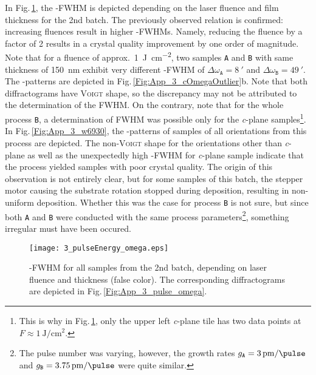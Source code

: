 In Fig.\,\ref{Fig:Results_3_pulseOmega}, the \textomega-FWHM is depicted depending on the laser fluence and film thickness for the 2nd batch.
The previously observed relation is confirmed: increasing fluences result in higher \textomega-FWHMs.
Namely, reducing the fluence by a factor of 2 results in a crystal quality improvement by one order of magnitude.
Note that for a fluence of approx.\ \qty{1}{\J\per\cm\squared}, two samples \texttt{A} and \texttt{B} with same thickness of \qty{150}{\nm} exhibit very different \textomega-FWHM of $\Delta\omega_\mathtt{A}=\qty{8}{\arcminute}$ and $\Delta\omega_\mathtt{B}=\qty{49}{\arcminute}$.
The \textomega-patterns are depicted in Fig.\,\ref{Fig:App_3_cOmegaOutlier}b.
Note that both diffractograms have \textsc{Voigt} shape, so the discrepancy may not be attributed to the determination of the \gls{FWHM}.
On the contrary, note that for the whole process \texttt{B}, a determination of FWHM was possible only for the \textit{c}-plane samples\footnote{
    This is why in Fig.\,\ref{Fig:Results_3_pulseOmega}, only the upper left \textit{c}-plane tile has two data points at $F\approx\qty{1}{\J\per\cm\squared}$.
}.
In Fig.\,\ref{Fig:App_3_w6930}, the \textomega-patterns of samples of all orientations from this process are depicted.
The non-\textsc{Voigt} shape for the orientations other than \textit{c}-plane as well as the unexpectedly high \textomega-FWHM for \textit{c}-plane sample indicate that the process yielded samples with poor crystal quality.
The origin of this observation is not entirely clear, but for some samples of this batch, the stepper motor causing the substrate rotation stopped during deposition, resulting in non-uniform deposition.
Whether this was the case for process \texttt{B} is not sure, but since both \texttt{A} and \texttt{B} were conducted with the same process parameters\footnote{
    The pulse number was varying, however, the growth rates $g_\mathtt{A}=\qty{3}{\pm\per\pulse}$ and $g_\mathtt{B}=\qty{3.75}{\pm\per\pulse}$ were quite similar.
},
something irregular must have been occured.

\begin{figure}
    \centering
    \texttt{[image: 3\_pulseEnergy\_omega.eps]}
    \caption{
        \textomega-FWHM for all samples from the 2nd batch, depending on laser fluence and thickness (false color).
        The corresponding diffractograms are depicted in Fig.\,\ref{Fig:App_3_pulse_omega}. 
    }
    \label{Fig:Results_3_pulseOmega}
\end{figure}